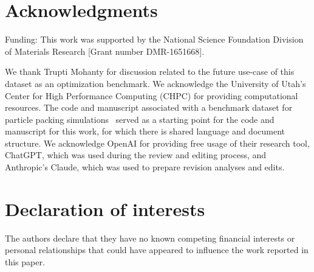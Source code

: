 \documentclass[pdflatex,sn-mathphys-num]{sn-jnl}
\begin{document}
\section*{Acknowledgments}

Funding: This work was supported by the National Science Foundation Division of Materials Research [Grant number DMR-1651668].

We thank Trupti Mohanty for discussion related to the future use-case of this dataset as an optimization benchmark. We acknowledge the University of Utah's Center for High Performance Computing (CHPC) for providing computational resources. The code and manuscript associated with a benchmark dataset for particle packing simulations~\cite{Existing08_Baird2023_HardSphere} served as a starting point for the code and manuscript for this work, for which there is shared language and document structure. We acknowledge OpenAI for providing free usage of their research tool, ChatGPT, which was used during the review and editing process, and Anthropic's Claude, which was used to prepare revision analyses and edits.

\section*{Declaration of interests}

The authors declare that they have no known competing financial interests or personal relationships that could have appeared to influence the work reported in this paper.


\end{document}
